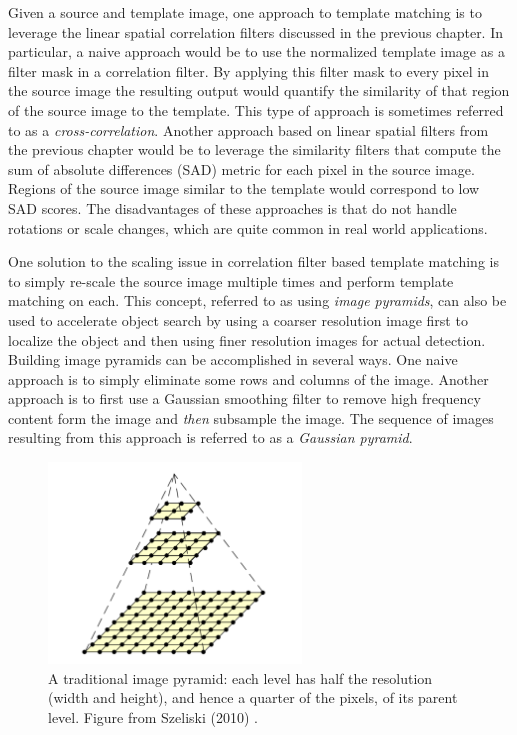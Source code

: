 Given a source and template image, one approach to template matching is to leverage the linear spatial correlation filters discussed in the previous chapter. In particular, a naive approach would be to use the normalized template image as a filter mask in a correlation filter. By applying this filter mask to every pixel in the source image the resulting output would quantify the similarity of that region of the source image to the template. This type of approach is sometimes referred to as a \textit{cross-correlation}.
Another approach based on linear spatial filters from the previous chapter would be to leverage the similarity filters that compute the sum of absolute differences (SAD) metric for each pixel in the source image. Regions of the source image similar to the template would correspond to low SAD scores.
The disadvantages of these approaches is that do not handle rotations or scale changes, which are quite common in real world applications.

One solution to the scaling issue in correlation filter based template matching is to simply re-scale the source image multiple times and perform template matching on each. This concept, referred to as using \textit{image pyramids}\cite{Szeliski2010}, can also be used to accelerate object search by using a coarser resolution image first to localize the object and then using finer resolution images for actual detection. Building image pyramids can be accomplished in several ways. One naive approach is to simply eliminate some rows and columns of the image. Another approach is to first use a Gaussian smoothing filter to remove high frequency content form the image and \textit{then} subsample the image. The sequence of images resulting from this approach is referred to as a \textit{Gaussian pyramid}.

\begin{figure}[ht]
  \centering
  \includegraphics[width=0.6\textwidth]{tex/figs/ch12_fig/image_pyramid.png}
\caption{A traditional image pyramid: each level has half the resolution (width and height), and hence a quarter of the pixels, of its parent level. Figure from Szeliski (2010) \nocite{Szeliski2010}.}
\label{image-pyramid}
\end{figure}

